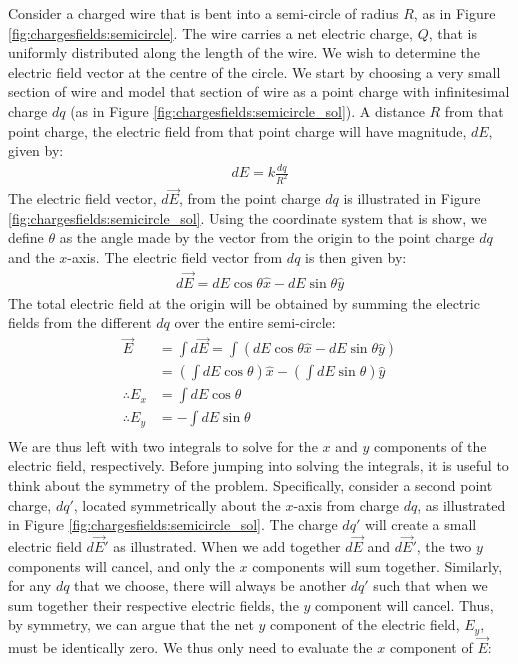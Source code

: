 Consider a charged wire that is bent into a semi-circle of radius $R$, as in Figure \ref{fig:chargesfields:semicircle}. The wire carries a net electric charge, $Q$, that is uniformly distributed along the length of the wire. We wish to determine the electric field vector at the centre of the circle. 
We start by choosing a very small section of wire and model that section of wire as a point charge with infinitesimal charge $dq$ (as in Figure \ref{fig:chargesfields:semicircle_sol}). A distance $R$ from that point charge, the electric field from that point charge will have magnitude, $dE$, given by:
\begin{align*}
dE=k\frac{dq}{R^2}
\end{align*}
The electric field vector, $d\vec E$, from the point charge $dq$ is illustrated in Figure \ref{fig:chargesfields:semicircle_sol}.
Using the coordinate system that is show, we define $\theta$ as the angle made by the vector from the origin to the point charge $dq$ and the $x$-axis. The electric field vector from $dq$ is then given by:
\begin{align*}
d\vec E = dE\cos\theta \hat x - dE\sin\theta \hat y
\end{align*}
The total electric field at the origin will be obtained by summing the electric fields from the different $dq$ over the entire semi-circle:
\begin{align*}
\vec E &= \int d\vec E = \int \left(dE\cos\theta \hat x - dE\sin\theta \hat y\right)\\
&=\left( \int dE\cos\theta \right)\hat x -\left( \int dE\sin\theta \right)\hat y\\
\therefore E_x &= \int dE\cos\theta\\
\therefore E_y &= -\int dE\sin\theta\\
\end{align*}
We are thus left with two integrals to solve for the $x$ and $y$ components of the electric field, respectively. Before jumping into solving the integrals, it is useful to think about the symmetry of the problem. Specifically, consider a second point charge, $dq'$, located symmetrically about the $x$-axis from charge $dq$, as illustrated in Figure \ref{fig:chargesfields:semicircle_sol}. The charge $dq'$ will create a small electric field $d\vec E'$ as illustrated. When we add together $d\vec E$ and $d\vec E'$, the two $y$ components will cancel, and only the $x$ components will sum together. Similarly, for any $dq$ that we choose, there will always be another $dq'$ such that when we sum together their respective electric fields, the $y$ component will cancel. Thus, by symmetry, we can argue that the net $y$ component of the electric field, $E_y$, must be identically zero. We thus only need to evaluate the $x$ component of $\vec E$:
